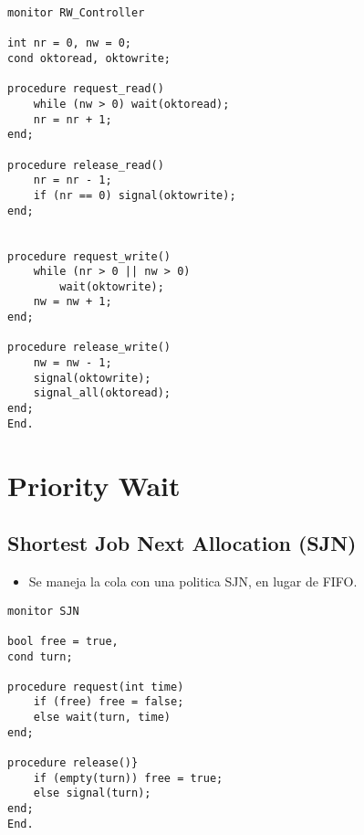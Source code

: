 \documentclass[a4paper, 10pt]{report}
\begin{document}
\begin{lstlisting}[multicols=2]
monitor RW_Controller

int nr = 0, nw = 0;
cond oktoread, oktowrite;

procedure request_read()
    while (nw > 0) wait(oktoread);
    nr = nr + 1;
end;

procedure release_read()
    nr = nr - 1;
    if (nr == 0) signal(oktowrite);
end;


procedure request_write()
    while (nr > 0 || nw > 0) 
        wait(oktowrite);
    nw = nw + 1;
end;

procedure release_write()
    nw = nw - 1;
    signal(oktowrite);
    signal_all(oktoread);
end;
End.
\end{lstlisting}

\section{Priority Wait}

\subsection{Shortest Job Next Allocation (SJN)}

\begin{itemize}
    \item Se maneja la cola con una politica SJN, en lugar de FIFO.
\end{itemize}

\begin{lstlisting}[multicols=2]
monitor SJN

bool free = true,
cond turn;

procedure request(int time)
    if (free) free = false;
    else wait(turn, time)
end;

procedure release()}
    if (empty(turn)) free = true;
    else signal(turn);
end;
End.
\end{lstlisting}
\end{document}
